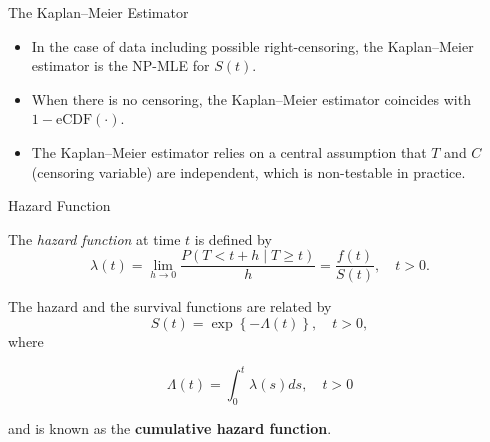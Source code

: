 \documentclass[12pt,t,handout]{beamer}
\begin{document}
\begin{frame}[c]{The Kaplan--Meier Estimator}

\begin{center}
\begin{itemize}
  \itemsep12pt
  \item In the case of data including possible right-censoring, the Kaplan--Meier
    estimator is the NP-MLE for $S(t)$.
  \item When there is no censoring, the Kaplan--Meier estimator coincides with
    $1 - \text{eCDF}(\cdot)$.
  \item The Kaplan--Meier estimator relies on a central assumption that $T$ and
    $C$ (censoring variable) are independent, which is non-testable in practice.
\end{itemize}
\end{center}


\end{frame}


\begin{frame}[c]{Hazard Function}

The \textit{hazard function} at time $t$ is defined by
$$\lambda(t) = \lim_{h \to 0}
 \frac{P\left(T< t+h \mid T\geq t \right)}{h}= \frac{f(t)}{S(t)}, \quad t > 0.$$

The hazard and the survival functions are related by
$$S(t) = \exp\left\{-\Lambda(t)\right\}, \quad t > 0,$$
where

$$\Lambda(t) = \int_0^t \lambda(s) ds, \quad t > 0$$

and is known as the \textbf{cumulative hazard function}.

\note{
}
\end{frame}

\end{document}
